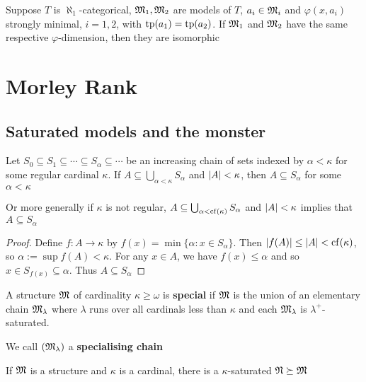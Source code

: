 \documentclass[11pt]{article}
\begin{document}
\begin{corollary}[]
Suppose \(T\) is \(\aleph_1\)-categorical, \(\mathfrak{M}_1,\mathfrak{M}_2\) are models of \(T\), \(a_i\in\mathfrak{M}_i\) and \(\varphi(x,a_i)\)
strongly minimal, \(i=1,2\), with \(\operatorname{tp}(a_1)=\operatorname{tp}(a_2)\). If \(\mathfrak{M}_1\) and \(\mathfrak{M}_2\) have the same
respective \(\varphi\)-dimension, then they are isomorphic
\end{corollary}
\section{Morley Rank}
\label{sec:org6520621}
\subsection{Saturated models and the monster}
\label{sec:orgf1eb867}
\begin{lemma}[]
\label{11-1}
Let \(S_0\subseteq S_1\subseteq\cdots\subseteq S_\alpha\subseteq\cdots\) be an increasing chain of sets indexed by \(\alpha<\kappa\) for some regular
cardinal \(\kappa\). If \(A\subseteq\bigcup_{\alpha<\kappa}S_\alpha\) and \(\abs{A}<\kappa\), then \(A\subseteq S_\alpha\) for some \(\alpha<\kappa\)

Or more generally if \(\kappa\) is not regular, \(A\subseteq\bigcup_{\alpha<\operatorname{cf}(\kappa)}S_\alpha\) and \(\abs{A}<\kappa\) implies
that \(A\subseteq S_\alpha\)
\end{lemma}

\begin{proof}
Define \(f:A\to\kappa\) by \(f(x)=\min\{\alpha:x\in S_\alpha\}\). Then \(\abs{f(A)}\le\abs{A}<\cf(\kappa)\),
so \(\alpha:=\sup f(A)<\kappa\). For any \(x\in A\), we have \(f(x)\le\alpha\) and so \(x\in S_{f(x)}\subseteq\alpha\).
Thus \(A\subseteq S_\alpha\)
\end{proof}

\begin{definition}[]
A structure \(\mathfrak{M}\) of cardinality \(\kappa\ge\omega\) is \textbf{special} if \(\mathfrak{M}\) is the union of an elementary
chain \(\mathfrak{M}_\lambda\) where \(\lambda\) runs over all cardinals less than \(\kappa\) and each \(\mathfrak{M}_\lambda\) is \(\lambda^+\)-saturated.
\end{definition}


We call \((\mathfrak{M}_\lambda)\) a \textbf{specialising chain}

\begin{theorem}[]
If \(\mathfrak{M}\) is a structure and \(\kappa\) is a cardinal, there is a \(\kappa\)-saturated \(\mathfrak{N}\succeq\mathfrak{M}\)
\end{theorem}
\end{document}

